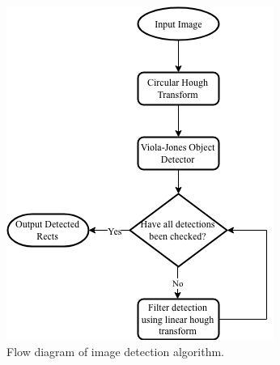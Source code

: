 \documentclass[conference]{IEEEtran}
\begin{document}
\begin{figure}[htbp]
\begin{center}
\includegraphics[width=0.6\linewidth]{images/flowdiagram.png}
\caption{Flow diagram of image detection algorithm. }
\label{default}
\end{center}
\end{figure}
\end{document}
